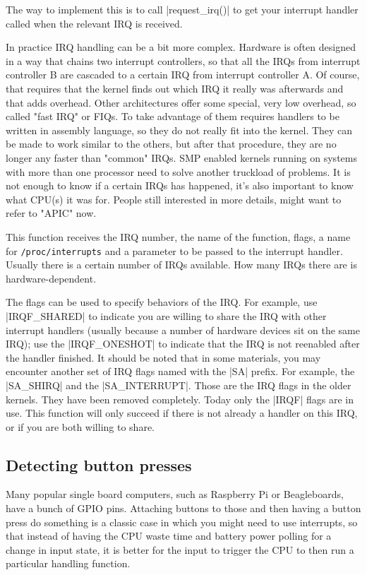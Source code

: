 \documentclass[10pt, oneside]{book}
\begin{document}
The way to implement this is to call \cpp|request_irq()| to get your interrupt handler called when the relevant IRQ is received.

In practice IRQ handling can be a bit more complex.
Hardware is often designed in a way that chains two interrupt controllers, so that all the IRQs from interrupt controller B are cascaded to a certain IRQ from interrupt controller A.
Of course, that requires that the kernel finds out which IRQ it really was afterwards and that adds overhead. Other architectures offer some special, very low overhead, so called "fast IRQ" or FIQs.
To take advantage of them requires handlers to be written in assembly language, so they do not really fit into the kernel.
They can be made to work similar to the others, but after that procedure, they are no longer any faster than "common" IRQs.
SMP enabled kernels running on systems with more than one processor need to solve another truckload of problems.
It is not enough to know if a certain IRQs has happened, it's also important to know what CPU(s) it was for.
People still interested in more details, might want to refer to "APIC" now.

This function receives the IRQ number, the name of the function, flags, a name for \verb|/proc/interrupts| and a parameter to be passed to the interrupt handler.
Usually there is a certain number of IRQs available.
How many IRQs there are is hardware-dependent.

The flags can be used to specify behaviors of the IRQ.
For example, use \cpp|IRQF_SHARED| to indicate you are willing to share the IRQ with other interrupt handlers (usually because a number of hardware devices sit on the same IRQ); use the \cpp|IRQF_ONESHOT| to indicate that the IRQ is not reenabled after the handler finished.
It should be noted that in some materials, you may encounter another set of IRQ flags named with the \cpp|SA| prefix.
For example, the \cpp|SA_SHIRQ| and the \cpp|SA_INTERRUPT|.
Those are the IRQ flags in the older kernels.
They have been removed completely.
Today only the \cpp|IRQF| flags are in use.
This function will only succeed if there is not already a handler on this IRQ, or if you are both willing to share.

\subsection{Detecting button presses}
\label{sec:detect_button}
Many popular single board computers, such as Raspberry Pi or Beagleboards, have a bunch of GPIO pins.
Attaching buttons to those and then having a button press do something is a classic case in which you might need to use interrupts,
so that instead of having the CPU waste time and battery power polling for a change in input state, it is better for the input to trigger the CPU to then run a particular handling function.
\end{document}

